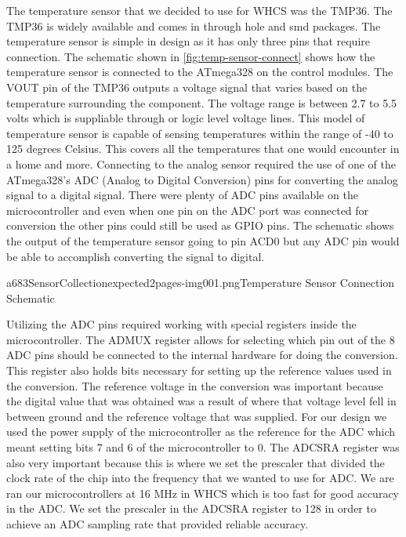 The temperature sensor that we decided to use for WHCS was the TMP36. The
TMP36 is widely available and comes in through hole and smd packages. The
temperature sensor is simple in design as it has only three pins that require
connection. The schematic shown in \autoref{fig:temp-sensor-connect} shows how the
temperature sensor is connected to the ATmega328 on the control modules.
The VOUT pin of the TMP36 outputs a voltage signal that varies based on the
temperature surrounding the component. The voltage range is between 2.7 to 5.5
volts which is suppliable through or logic level voltage lines. This model
of temperature sensor is capable of sensing temperatures within the range of
{}-40 to 125 degrees Celsius. This covers all the temperatures that one would
encounter in a home and more. Connecting to the analog sensor required the
use of one of the ATmega328's ADC (Analog to Digital Conversion) pins for
converting the analog signal to a digital signal. There were plenty of ADC pins
available on the microcontroller and even when one pin on the ADC port was
connected for conversion the other pins could still be used as GPIO pins. The
schematic shows the output of the temperature sensor going to pin ACD0 but any
ADC pin would be able to accomplish converting the signal to digital.

{a683SensorCollectionexpected2pages-img001.png}{Temperature Sensor Connection Schematic}

Utilizing the ADC pins required working with special registers inside the
microcontroller. The ADMUX register allows for selecting which pin out of the 8
ADC pins should be connected to the internal hardware for doing the conversion.
This register also holds bits necessary for setting up the reference values
used in the conversion. The reference voltage in the conversion was important
because the digital value that was obtained was a result of where that voltage
level fell in between ground and the reference voltage that was supplied. For
our design we used the power supply of the microcontroller as the
reference for the ADC which meant setting bits 7 and 6 of the microcontroller
to 0. The ADCSRA register was also very important because this is where we set
the prescaler that divided the clock rate of the chip into the frequency
that we wanted to use for ADC. We are ran our microcontrollers at 16 MHz in
WHCS which is too fast for good accuracy in the ADC. We set the prescaler
in the ADCSRA register to 128 in order to achieve an ADC sampling rate that
provided reliable accuracy.

